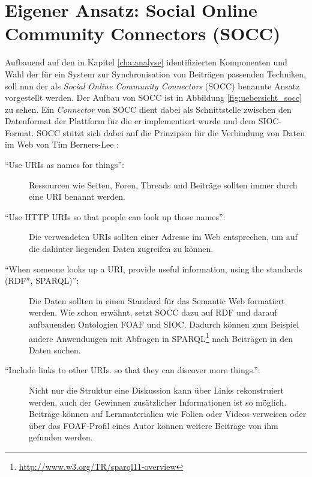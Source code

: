 
\chapter{Eigener Ansatz: Social Online Community Connectors (SOCC)} %
\label{cha:eigener_ansatz_social_online_community_connectors_socc_}

Aufbauend auf den in Kapitel \ref{cha:analyse} identifizierten Komponenten und Wahl der für ein System zur Synchronisation von Beiträgen passenden Techniken, soll nun der als \emph{Social Online Community Connectors} (SOCC) benannte Ansatz vorgestellt werden. Der Aufbau von SOCC ist in Abbildung \ref{fig:uebersicht_socc} zu sehen. Ein \emph{Connector} von SOCC dient dabei als Schnittstelle zwischen den Datenformat der Plattform für die er implementiert wurde und dem SIOC-Format. SOCC stützt sich dabei auf die Prinzipien für die Verbindung von Daten im Web von Tim Berners-Lee \cite{Berners-Lee2009}:

\begin{description}
    \item[\enquote{Use URIs as names for things}:] Ressourcen wie Seiten, Foren, Threads und Beiträge sollten immer durch eine URI benannt werden.

    \item[\enquote{Use HTTP URIs so that people can look up those names}:] Die verwendeten URIs sollten einer Adresse im Web entsprechen, um auf die dahinter liegenden Daten zugreifen zu können.

    \item[\enquote{When someone looks up a URI, provide useful information, using the standards (RDF*, SPARQL)}:] Die Daten sollten in einen Standard für das Semantic Web formatiert werden. Wie schon erwähnt, setzt SOCC dazu auf RDF und darauf aufbauenden Ontologien FOAF und SIOC. Dadurch können zum Beispiel andere Anwendungen mit Abfragen in SPARQL\footnote{\url{http://www.w3.org/TR/sparql11-overview}} nach Beiträgen in den Daten suchen.

    \item[\enquote{Include links to other URIs. so that they can discover more things.}:] Nicht nur die Struktur eine Diskussion kann über Links rekonstruiert werden, auch der Gewinnen zusätzlicher Informationen ist so möglich. Beiträge können auf Lernmaterialien wie Folien oder Videos verweisen oder über das FOAF-Profil eines Autor können weitere Beiträge von ihm gefunden werden. 
\end{description}

